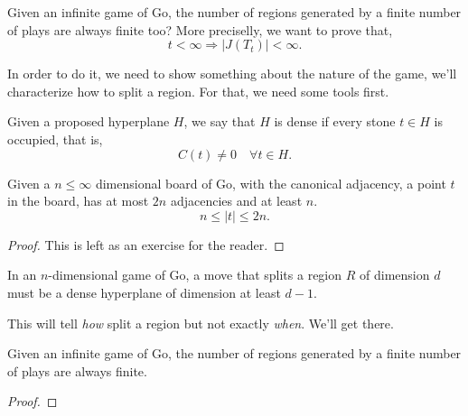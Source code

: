 Given an infinite game of Go, the number of regions generated by a finite number of plays are always finite too?
More preciselly, we want to prove that,
$$t < \infty \Rightarrow |J(T_t)|<\infty.$$

In order to do it, we need to show something about the nature of the game, we'll characterize how to split a region. For that, we need some tools first.

\begin{definition}
	Given a proposed hyperplane $H$, we say that $H$ is dense
	if every stone $t\in H$ is occupied, that is,
	$$C(t)\neq 0 \quad \forall t\in H.$$
\end{definition}

\begin{lemma}\label{lem_2n}
	Given a $n\leq \infty$ dimensional board of Go, with the canonical adjacency, a point $t$ in the board, has at most $2n$ adjacencies and at least $n$.
	$$n \leq |t|\leq 2n.$$
\end{lemma}
\begin{proof}
	This is left as an exercise for the reader.
\end{proof}








\begin{theorem}\label{lem_bigplays}
	In an $n$-dimensional game of Go, a move that splits a
	region $R$ of dimension $d$ must be a dense hyperplane
	of dimension at least $d-1$.
\end{theorem}
This will tell \textit{how} split a region but not exactly \textit{when}. We'll get there.







\begin{theorem}
	Given an infinite game of Go, the number of regions generated by a finite number of plays are always finite.
\end{theorem}
\begin{proof}

\end{proof}

